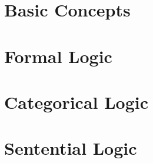 \documentclass[nobib]{tufte-book}
\begin{document}

\raggedright
\setlength{\parindent}{1em}
\setlength{\parskip}{1em}

\frontmatter
\pagestyle{plain} %




{
\setlength{\parskip}{0em}

\renewcommand{\cftpartpresnum}{\sf\Large\partname\ }
\tableofcontents
}






\mainmatter
\setlength{\parindent}{1em}
\pagestyle{headings} %
\label{full_version} %

\listoffigures %

\newpage
\listoftables %

%
\part{Basic Concepts} \label{part:basic_concepts}



\part{Formal Logic}\label{part:formal_logic}


\part{Categorical Logic}\label{part:cat_logic}


\part{Sentential Logic} \label{part:sent_logic}


\end{document}
